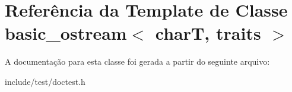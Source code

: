 \hypertarget{classbasic__ostream}{}\section{Referência da Template de Classe basic\+\_\+ostream$<$ charT, traits $>$}
\label{classbasic__ostream}


A documentação para esta classe foi gerada a partir do seguinte arquivo\+:\begin{DoxyCompactItemize}
\item 
include/test/doctest.\+h\end{DoxyCompactItemize}
